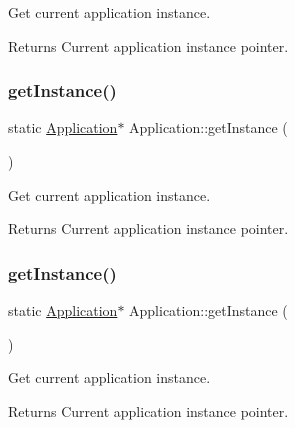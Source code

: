 Get current application instance. 

\begin{DoxyReturn}{Returns}
Current application instance pointer. 
\end{DoxyReturn}
\mbox{\label{classApplication_ab5dba709d2e806d5d83c297bab6cdace}} 
\subsubsection{\texorpdfstring{get\+Instance()}{getInstance()}\hspace{0.1cm}{\footnotesize\ttfamily [8/12]}}
{\footnotesize\ttfamily static \hyperlink{classApplication}{Application}$\ast$ Application\+::get\+Instance (\begin{DoxyParamCaption}{ }\end{DoxyParamCaption})\hspace{0.3cm}{\ttfamily [static]}}



Get current application instance. 

\begin{DoxyReturn}{Returns}
Current application instance pointer. 
\end{DoxyReturn}
\mbox{\label{classApplication_ab5dba709d2e806d5d83c297bab6cdace}} 
\subsubsection{\texorpdfstring{get\+Instance()}{getInstance()}\hspace{0.1cm}{\footnotesize\ttfamily [9/12]}}
{\footnotesize\ttfamily static \hyperlink{classApplication}{Application}$\ast$ Application\+::get\+Instance (\begin{DoxyParamCaption}{ }\end{DoxyParamCaption})\hspace{0.3cm}{\ttfamily [static]}}



Get current application instance. 

\begin{DoxyReturn}{Returns}
Current application instance pointer. 
\end{DoxyReturn}
\mbox{\label{classApplication_ab5dba709d2e806d5d83c297bab6cdace}} 
